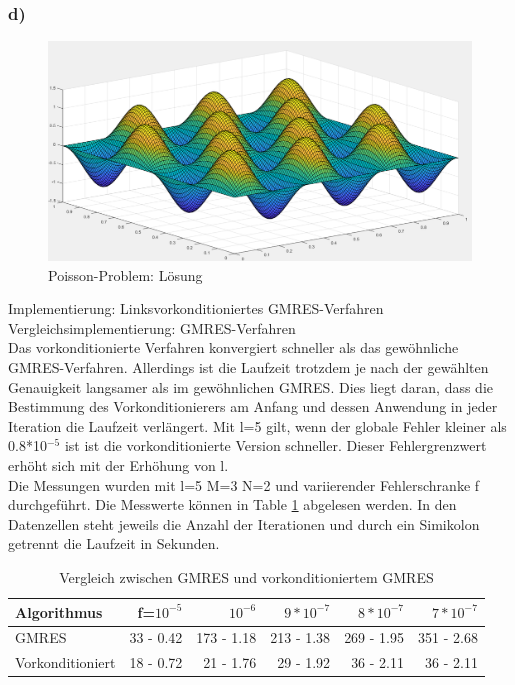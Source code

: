 \documentclass{report}
\begin{document}
\subsubsection{d)}
\begin{figure}
	\includegraphics[width=\linewidth]{Aufgaben-Ressourcen/A6L7M3N2.png}
		\caption{Poisson-Problem: Lösung}
\end{figure}

Implementierung: Linksvorkonditioniertes GMRES-Verfahren\\
Vergleichsimplementierung: GMRES-Verfahren\\
Das vorkonditionierte Verfahren konvergiert schneller als das gewöhnliche GMRES-Verfahren. Allerdings ist die Laufzeit trotzdem je nach der gewählten Genauigkeit langsamer als im gewöhnlichen GMRES. Dies liegt daran, dass die Bestimmung des Vorkonditionierers am Anfang und dessen Anwendung in jeder Iteration die Laufzeit verlängert. Mit l=5 gilt, wenn der globale Fehler kleiner als 0.8*10$^{-5}$ ist ist die vorkonditionierte Version schneller. Dieser Fehlergrenzwert erhöht sich mit der Erhöhung von l.\\
Die Messungen wurden mit l=5 M=3 N=2 und variierender Fehlerschranke f durchgeführt. Die Messwerte können in Table \ref{Table:2_4d} abgelesen werden. In den Datenzellen steht jeweils die Anzahl der Iterationen und durch ein Simikolon getrennt die Laufzeit in Sekunden.\\
\begin{table}
\begin{tabular}{|l|r|r|r|r|r|}
	\hline
	Algorithmus&f=$10^{-5}$ &$10^{-6}$&$9*10^{-7}$& $8*10^{-7}$& $7*10^{-7}$\\
	\hline
	GMRES & 33 - 0.42 & 173 - 1.18 & 213 - 1.38 & 269 - 1.95 & 351 - 2.68 \\
	Vorkonditioniert & 18 - 0.72 & 21 - 1.76 & 29 - 1.92 & 36 - 2.11 & 36 - 2.11 \\
	\hline
	
\end{tabular}
	\caption{Vergleich zwischen GMRES und vorkonditioniertem GMRES}
	\label{Table:2_4d}
\end{table}
\end{document}
